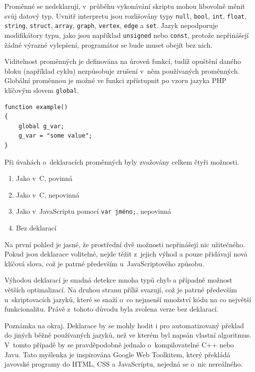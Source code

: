 \documentclass[11pt,twoside,a4paper]{book}
\begin{document}
Proměnné se nedeklarují, v~průběhu vykonávání skriptu mohou libovolně měnit svůj datový typ. Uvnitř interpretu jsou rozlišovány typy \texttt{null}, \texttt{bool}, \texttt{int}, \texttt{float}, \texttt{string}, \texttt{struct}, \texttt{array}, \texttt{graph}, \texttt{vertex}, \texttt{edge} a \texttt{set}. Jazyk nepodporuje modifikátory typu, jako jsou například \texttt{unsigned} nebo \texttt{const}, protože nepřinášejí žádné výrazné vylepšení, programátor se bude muset obejít bez nich.

Viditelnost proměnných je definována na úroveň funkcí, tudíž opuštění daného bloku (na\-pří\-klad cyklu) nezpůsobuje zrušení v~něm používaných proměnných. Globální pro\-měn\-nou je možné ve funkci zpřístupnit po vzoru jazyka PHP klíčovým slovem \texttt{global}.

\begin{verbatim}
function example()
{
    global g_var;
    g_var = "some value";
}
\end{verbatim}

Při úvahách o~deklaracích proměnných byly zvažovány celkem čtyři možnosti.

\begin{enumerate}
\item Jako v~C, povinná
\item Jako v~C, nepovinná
\item Jako v~JavaScriptu pomocí \texttt{var jméno;}, nepovinná
\item Bez deklarací
\end{enumerate}

Na první pohled je jasné, že prostřední dvě možnosti nepřinášejí nic užitečného. Pokud jsou deklarace volitelné, nejde těžit z~jejich výhod a pouze přidávají nová klíčová slova, což je patrné především u~JavaScriptového způsobu.

Výhodou deklarací je snadná detekce mnoha typů chyb a případně možnost větších optimalizací. Na druhou stranu příliš svazují, což je patrné především u~skriptovacích jazyků, které se snaží o~co nejmenší množství kódu na co největší funkcionalitu. Právě z~tohoto důvodu byla zvolena verze bez deklarací.

Poznámka na okraj. Deklarace by se mohly hodit i pro automatizovaný překlad do jiných běžně používaných jazyků, než ve kterém byl napsán vlastní algoritmus. V~tomto případě by se pravděpodobně jednalo o~kompilovatelné C++ nebo Javu. Tato myšlenka je inspirována Google Web Toolkitem, který překládá javovské programy do HTML, CSS a JavaScriptu, nejedná se o~nic nereálného.
\end{document}
